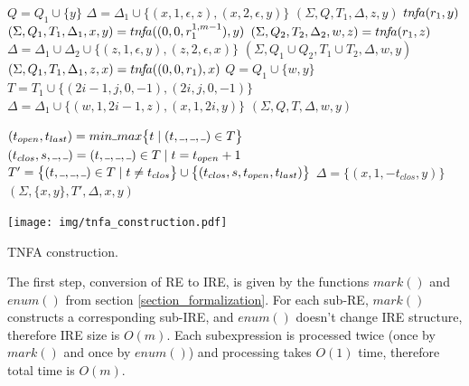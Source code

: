 \documentclass[AMA,STIX1COL]{WileyNJD-v2}
\let\oldnl\nl %
\newcommand{\nonl}{\renewcommand{\nl}{\let\nl\oldnl}} %
\newcommand{\Xund}{\rule{.4em}{.4pt}}
\begin{document}
\begin{algorithm}[]
\begin{multicols}{2}
{{            $Q = Q_1 \cup \{y\}$ \;
            $\Delta = \Delta_1 \cup \big\{ (x, 1, \epsilon, z), (x, 2, \epsilon, y) \big\}$ \;
            \Return $(\Sigma, Q, T_1, \Delta, z, y)$
        }
        \BlankLine
         {
            \Return $tn\!f\!a (r_1, y)$
        }
        \BlankLine
         {
            $(\Sigma, Q_1, T_1, \Delta_1, x, y) = tn\!f\!a ((0, 0, r_1^{1,m-1}), y)$ \;
            $(\Sigma, Q_2, T_2, \Delta_2, w, z) = tn\!f\!a (r_1, z)$ \;
            $\Delta = \Delta_1 \cup \Delta_2 \cup \big\{ (z, 1, \epsilon, y), (z, 2, \epsilon, x) \big\}$ \;
            \Return $(\Sigma, Q_1 \cup Q_2, T_1 \cup T_2, \Delta, w, y)$
        }
        \BlankLine
         {
            $(\Sigma, Q_1, T_1, \Delta_1, z, x) = tn\!f\!a ((0, 0, r_1), x)$ \;
            $Q = Q_1 \cup \{w, y\}$ \;
            $T = T_1 \cup \big\{ (2i\!-\!1, j, 0, -1), (2i, j, 0, -1) \big\}$ \;
            $\Delta = \Delta_1 \cup \big\{ (w, 1, 2i\!-\!1, z), (x, 1, 2i, y) \big\}$ \;
            \Return $(\Sigma, Q, T, \Delta, w, y)$
        }
    }
    \BlankLine
    \BlankLine

     {
        $(t_{open}, t_{last}) = min \Xund max \big\{ t \mid (t, \Xund, \Xund, \Xund) \in T \big\}$ \;
        $(t_{clos}, s, \Xund, \Xund) = (t, \Xund, \Xund, \Xund) \in T \mid t = t_{open} + 1$ \;
        $T' = \big\{ (t, \Xund, \Xund, \Xund) \in T \mid t \neq t_{clos} \big\} \cup \big\{ (t_{clos}, s, t_{open}, t_{last}) \big\}$ \;
        $\Delta = \big\{ (x, 1, -t_{clos}, y) \big\}$ \;
        \Return $(\Sigma, \{x, y\}, T', \Delta, x, y)$ \;
    }

    \vfill

\columnbreak

    \nonl \texttt{[image: img/tnfa\_construction.pdf]}

\end{multicols}
\vspace{0.5em}
\caption{TNFA construction.}
\end{algorithm}

The first step, conversion of RE to IRE, is given by the functions $mark()$ and $enum()$ from section \ref{section_formalization}.
%
For each sub-RE, $mark()$ constructs a corresponding sub-IRE,
and $enum()$ doesn't change IRE structure,
therefore IRE size is $O(m)$.
%
Each subexpression is processed twice (once by $mark()$ and once by $enum()$)
and processing takes $O(1)$ time, therefore total time is $O(m)$.
\\
\end{document}
